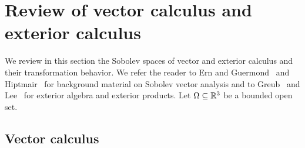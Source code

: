\documentclass[10pt,letterpaper]{article}
\newcommand\cye[1]{%
  \protect\leavevmode
  \begingroup
    \color{red!35!yellow}%
    #1%
  \endgroup
}
\begin{document}













































\section{Review of vector calculus and exterior calculus}\label{section:calculus}

We review \cye{in this section} the Sobolev spaces of vector \cye{and exterior} calculus and their transformation behavior. We refer the reader to Ern and Guermond~\cite{ern2021finite} and Hiptmair~\cite{hiptmair2002finite} for background material on Sobolev vector analysis and to Greub~\cite{greub1967multilinear} and Lee~\cite{lee2012smooth} for exterior algebra and exterior products. Let $\Omega \subseteq {\mathbb R}^{3}$ be a bounded open set. 

\subsection{\cye{Vector calculus}}
\end{document}
